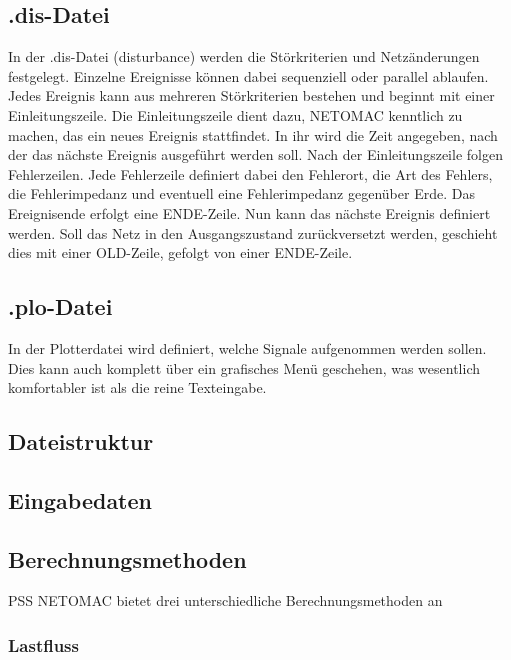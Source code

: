 \documentclass{scrartcl}
\begin{document}
\begin{onehalfspace}
\subsection{.dis-Datei}
In der .dis-Datei (\glqq disturbance\grqq) werden die Störkriterien und Netzänderungen festgelegt. Einzelne Ereignisse können dabei sequenziell oder parallel ablaufen. Jedes Ereignis kann aus mehreren Störkriterien bestehen und beginnt mit einer Einleitungszeile. Die Einleitungszeile dient dazu, NETOMAC kenntlich zu machen, das ein neues Ereignis stattfindet. In ihr wird die Zeit angegeben, nach der das nächste Ereignis ausgeführt werden soll. Nach der Einleitungszeile folgen Fehlerzeilen. Jede Fehlerzeile definiert dabei den Fehlerort, die Art des Fehlers, die Fehlerimpedanz und eventuell eine Fehlerimpedanz gegenüber Erde. Das Ereignisende erfolgt eine \glqq ENDE\grqq -Zeile. Nun kann das nächste Ereignis definiert werden. Soll das Netz in den Ausgangszustand zurückversetzt werden, geschieht dies mit einer \glqq OLD\grqq -Zeile, gefolgt von einer \glqq ENDE\grqq -Zeile. 

\subsection{.plo-Datei}
In der Plotterdatei wird definiert, welche Signale aufgenommen werden sollen. Dies kann auch komplett über ein grafisches Menü geschehen, was wesentlich komfortabler ist als die reine Texteingabe.


\subsection{Dateistruktur}
\subsection{Eingabedaten}

\subsection{Berechnungsmethoden}
PSS NETOMAC bietet drei unterschiedliche Berechnungsmethoden an

\subsubsection{Lastfluss}



\end{onehalfspace}
\end{document}
